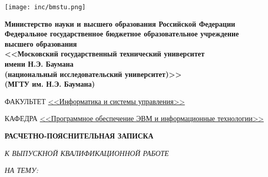 \documentclass[ut8x, 14pt, oneside, a4paper]{extarticle}
\begin{document}
	\begin{titlepage}
		\noindent\begin{minipage}{0.05\textwidth}
			\texttt{[image: inc/bmstu.png]}
		\end{minipage}
		\hfill
		\begin{minipage}{0.85\textwidth}\raggedleft
			\begin{center}
				\fontsize{12pt}{0.3\baselineskip}\selectfont \textbf{Министерство науки и высшего образования Российской Федерации \\ Федеральное государственное бюджетное образовательное учреждение \\ высшего образования \\ <<Московский государственный технический университет \\ имени Н.Э. Баумана \\ (национальный исследовательский университет)>> \\ (МГТУ им. Н.Э. Баумана)}
			\end{center}
		\end{minipage}
		
		\begin{center}
			\fontsize{12pt}{0.1\baselineskip}\selectfont
			\noindent\makebox[\linewidth]{\rule{\textwidth}{4pt}} \makebox[\linewidth]{\rule{\textwidth}{1pt}}
		\end{center}
		
		\begin{flushleft}
			\fontsize{12pt}{0.8\baselineskip}\selectfont 
			
			ФАКУЛЬТЕТ \uline{<<Информатика и системы управления>> \hfill}
			
			КАФЕДРА \uline{\mbox{\hspace{4mm}} <<Программное обеспечение ЭВМ и информационные технологии>> \hfill}
		\end{flushleft}
		
		\vfill
		
		\begin{center}
			\fontsize{20pt}{\baselineskip}\selectfont
			
			\textbf{РАСЧЕТНО-ПОЯСНИТЕЛЬНАЯ ЗАПИСКА}
			
			\textsl{К ВЫПУСКНОЙ КВАЛИФИКАЦИОННОЙ РАБОТЕ}
			
			\textsl{НА ТЕМУ:}
		\end{center}
		
		\begin{center}
			\fontsize{18pt}{0.6cm}\selectfont 
			

\end{center}
\end{titlepage}
\end{document}
